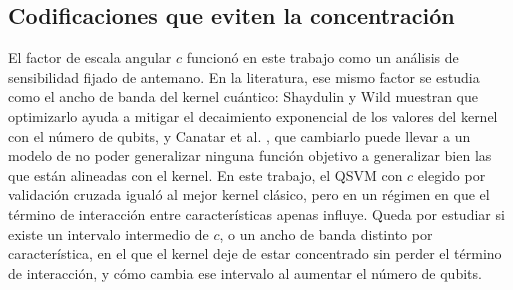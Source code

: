 
\subsection{Codificaciones que eviten la concentración}
\label{sec:futuro_codificacion}

El factor de escala angular $c$ funcionó en este trabajo como un análisis de sensibilidad fijado de
antemano. En la literatura, ese mismo factor se estudia como el ancho de banda del kernel cuántico:
Shaydulin y Wild \cite{Shaydulin2022Bandwidth} muestran que optimizarlo ayuda a mitigar el decaimiento
exponencial de los valores del kernel con el número de qubits, y Canatar et al.
\cite{Canatar2023Bandwidth}, que cambiarlo puede llevar a un modelo de no poder generalizar ninguna
función objetivo a generalizar bien las que están alineadas con el kernel.
En este trabajo, el QSVM con $c$ elegido por validación cruzada igualó al mejor kernel clásico, pero en
un régimen en que el término de interacción entre características apenas influye. Queda por estudiar si
existe un intervalo intermedio de $c$, o un ancho de banda distinto por característica, en el que el
kernel deje de estar concentrado sin perder el término de interacción, y cómo cambia ese intervalo al
aumentar el número de qubits.

